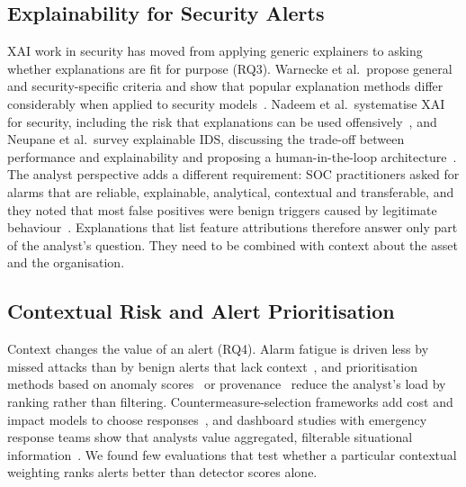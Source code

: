 \documentclass[conference]{IEEEtran}
\begin{document}
\subsection{Explainability for Security Alerts}
XAI work in security has moved from applying generic explainers to asking whether explanations are fit for purpose (RQ3). Warnecke et al.\ propose general and security-specific criteria and show that popular explanation methods differ considerably when applied to security models~\cite{warnecke2020evaluating}. Nadeem et al.\ systematise XAI for security, including the risk that explanations can be used offensively~\cite{nadeem2023sok}, and Neupane et al.\ survey explainable IDS, discussing the trade-off between performance and explainability and proposing a human-in-the-loop architecture~\cite{neupane2022xids}. The analyst perspective adds a different requirement: SOC practitioners asked for alarms that are reliable, explainable, analytical, contextual and transferable, and they noted that most false positives were benign triggers caused by legitimate behaviour~\cite{alahmadi2022false}. Explanations that list feature attributions therefore answer only part of the analyst's question. They need to be combined with context about the asset and the organisation.

\subsection{Contextual Risk and Alert Prioritisation}
Context changes the value of an alert (RQ4). Alarm fatigue is driven less by missed attacks than by benign alerts that lack context~\cite{alahmadi2022false}, and prioritisation methods based on anomaly scores~\cite{aminanto2020threat} or provenance~\cite{hassan2019nodoze} reduce the analyst's load by ranking rather than filtering. Countermeasure-selection frameworks add cost and impact models to choose responses~\cite{nespoli2018optimal}, and dashboard studies with emergency response teams show that analysts value aggregated, filterable situational information~\cite{kaufhold2022cyber}. We found few evaluations that test whether a particular contextual weighting ranks alerts better than detector scores alone.
\end{document}
